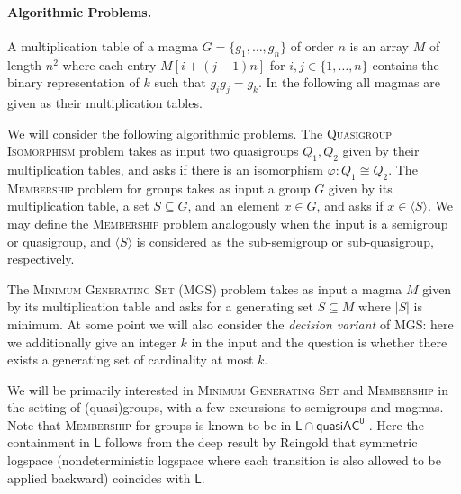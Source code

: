 \documentclass{article}
\newcommand{\algprobm}[1]{\textsc{#1}\xspace}
\newcommand*{\ComplexityClass}[1]{\ensuremath{\mathsf{#1}}\xspace}
\newcommand*{\LogSpace}{\ComplexityClass{L}}
\newcommand{\qACz}{\ComplexityClass{quasiAC^0}}
\begin{document}
\paragraph{Algorithmic Problems.} 
A multiplication table of a magma $G = \{g_1, \dots, g_n\}$ of order $n$ is an array $M$ of length $n^2$ where each entry $M[i+(j-1)n]$ for $i,j \in \{1, \dots, n\}$ contains the binary representation of $k$ such that $g_ig_j= g_k$. In the following all magmas are given as their multiplication tables.

We will consider the following algorithmic problems. The \algprobm{Quasigroup Isomorphism} problem takes as input two quasigroups $Q_{1}, Q_{2}$ given by their multiplication tables, and asks if there is an isomorphism $\varphi : Q_{1} \cong Q_{2}$. The \algprobm{Membership} problem for groups takes as input a group $G$ given by its multiplication table, a set $S \subseteq G$, and an element $x \in G$, and asks if $x \in \langle S \rangle$. We may define the \algprobm{Membership} problem analogously when the input is a semigroup or quasigroup, and $\langle S \rangle$ is considered as the sub-semigroup or sub-quasigroup, respectively.

The \algprobm{Minimum Generating Set} (\algprobm{MGS}) problem takes as input a magma $M$ given by its multiplication table and asks for a generating set $S \subseteq M$ where $|S|$ is minimum. At some point we will also consider the \emph{decision variant} of \algprobm{MGS}: here we additionally give an integer $k$ in the input and the question is whether there exists a generating set of cardinality at most $k$.

We will be primarily interested in \algprobm{Minimum Generating Set} and \algprobm{Membership} in the setting of (quasi)groups,  with a few excursions to semigroups and magmas. Note that \algprobm{Membership} for groups is known to be in $\LogSpace \cap \qACz$ \cite{BarringtonMcKenzie, Reingold, Fleischer}. Here the containment in \LogSpace follows from the deep result by Reingold \cite{Reingold} that symmetric logspace (nondeterministic logspace where each transition is also allowed to be applied backward) coincides with \LogSpace.
\end{document}
